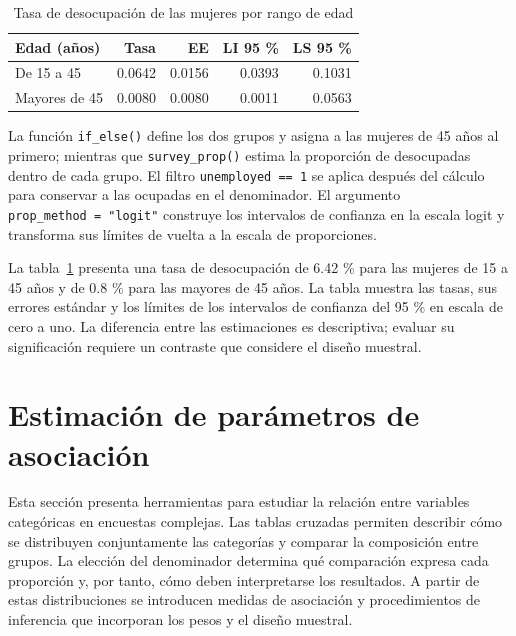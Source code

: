 \documentclass[
  spanish,
  11pt,
  letterpaper,
  oneside,
  open=any]{scrbook}
\begin{document}
{

\begin{longtable}[]{@{}lrrrr@{}}

\caption{\label{tbl-tasa-desocupacion-edad-mujer}Tasa de desocupación de
las mujeres por rango de edad}

\tabularnewline

\toprule\noalign{}
Edad (años) & Tasa & EE & LI 95 \% & LS 95 \% \\
\midrule\noalign{}
\endhead
\bottomrule\noalign{}
\endlastfoot
De 15 a 45 & 0.0642 & 0.0156 & 0.0393 & 0.1031 \\
Mayores de 45 & 0.0080 & 0.0080 & 0.0011 & 0.0563 \\

\end{longtable}

}

La función \texttt{if\_else()} define los dos grupos y asigna a las
mujeres de 45 años al primero; mientras que \texttt{survey\_prop()}
estima la proporción de desocupadas dentro de cada grupo. El filtro
\texttt{unemployed\ ==\ 1} se aplica después del cálculo para conservar
a las ocupadas en el denominador. El argumento
\texttt{prop\_method\ =\ "logit"} construye los intervalos de confianza
en la escala logit y transforma sus límites de vuelta a la escala de
proporciones.

La tabla~\ref{tbl-tasa-desocupacion-edad-mujer} presenta una tasa de
desocupación de 6.42 \% para las mujeres de 15 a 45 años y de 0.8 \%
para las mayores de 45 años. La tabla muestra las tasas, sus errores
estándar y los límites de los intervalos de confianza del 95 \% en
escala de cero a uno. La diferencia entre las estimaciones es
descriptiva; evaluar su significación requiere un contraste que
considere el diseño muestral.

\section{Estimación de parámetros de
asociación}\label{estimacion-parametros-asociacion-categoricas}

Esta sección presenta herramientas para estudiar la relación entre
variables categóricas en encuestas complejas. Las tablas cruzadas
permiten describir cómo se distribuyen conjuntamente las categorías y
comparar la composición entre grupos. La elección del denominador
determina qué comparación expresa cada proporción y, por tanto, cómo
deben interpretarse los resultados. A partir de estas distribuciones se
introducen medidas de asociación y procedimientos de inferencia que
incorporan los pesos y el diseño muestral.
\end{document}
